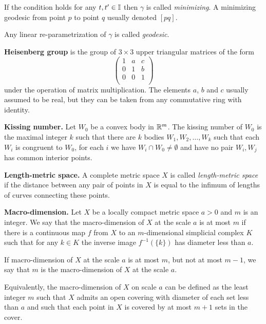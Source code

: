 \begin{description}
If the condition holds for any $t,t'\in\mathbb{I}$ then $\gamma$ is called \emph{minimizing}.
A minimizing geodesic from point $p$ to point $q$ usually denoted $[pq]$.

Any linear re-parametrization of $\gamma$ is called \emph{geodesic}.

\item{\bf Heisenberg group}\label{Heisenberg group}
is the group of $3\times3$ upper triangular matrices of the form
\[\begin{pmatrix}
 1 & a & c\\
 0 & 1 & b\\
 0 & 0 & 1\\
\end{pmatrix}\]
under the operation of matrix multiplication. The elements $a$, $b$ and $c$ usually assumed to be real,
but they can be taken from any commutative ring with identity.

\item{\bf Kissing number.}\label{Kissing number}
Let  $W_0$ be a convex body in $\mathbb{R}^m$.
The kissing number of $W_0$ is the maximal integer $k$ such that there are $k$ bodies $W_1,W_2,\dots,W_k$ such that each $W_i$ is congruent to $W_0$,
for each $i$ we have $W_i\cap W_0\not=\emptyset$ and have no pair $W_i,W_j$ has common interior points.

\item{\bf  Length-metric space.}\label{Length-metric space} 
A complete metric space $X$ is called {\it length-metric space}  if the distance between any pair of points in $X$ is equal to the infimum of lengths of curves connecting these points. 

\item{\bf Macro-dimension.}\label{Macro-dimension}
Let $X$ be a locally compact metric space $a>0$ and $m$ is an integer.
We say that the macro-dimension  of $X$ at the scale $a$ is at most $m$
if there is a continuous map $f$ from $X$ to an $m$-dimensional simplicial complex $K$
such that for any $k\in K$ the inverse image $f^{-1}(\{k\})$ has diameter less than $a$.

If macro-dimension of $X$ at the scale $a$ is at most $m$,
but not at most $m-1$, 
we say that $m$ is the macro-dimension of $X$ at the scale $a$.

Equivalently, the macro-dimension of $X$ on scale $a$ can be defined as 
the least integer $m$ such that $X$ admits an open covering with diameter of each set less than $a$ 
and such that each point in $X$ is covered by at most $m+1$ sets in the cover.



\end{description}
